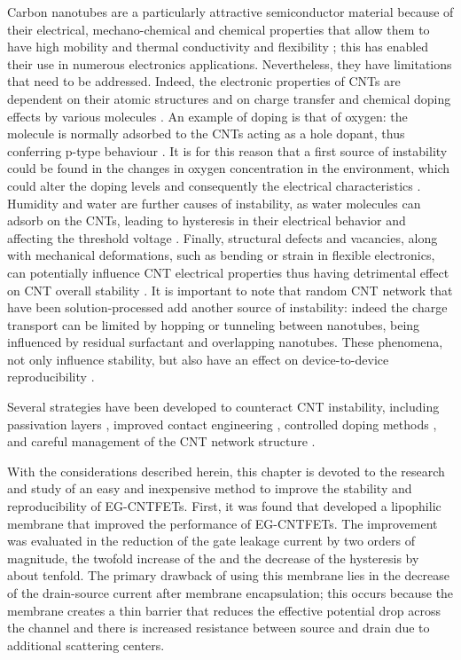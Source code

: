 Carbon nanotubes are a particularly attractive semiconductor material because of their electrical, mechano-chemical and chemical properties that allow them to have high mobility and thermal conductivity and flexibility \citep{joshiUnderstanding2018}; this has enabled their use in numerous electronics applications. Nevertheless, they have limitations that need to be addressed. Indeed, the electronic properties of CNTs are dependent on their atomic structures and on charge transfer and chemical doping effects by various molecules \citep{daiCarbon2002}. An example of doping is that of oxygen: the molecule is normally adsorbed to the CNTs acting as a hole dopant, thus conferring p-type behaviour \citep{daiCarbon2002,mceuenSinglewalled2002}. It is for this reason that a first source of instability could be found in the changes in oxygen concentration in the environment, which could alter the doping levels and consequently the electrical characteristics \citep{mceuenSinglewalled2002}. Humidity and water are further causes of instability, as water molecules can adsorb on the CNTs, leading to hysteresis in their electrical behavior and affecting the threshold voltage \citep{mceuenSinglewalled2002,kimHysteresis2003,zaumseilSemiconducting2019}. Finally, structural defects and vacancies, along with mechanical deformations, such as bending or strain in flexible electronics, can potentially influence CNT electrical properties thus having  detrimental effect on CNT overall stability \citep{daiCarbon2002,rodriguez-manzoCreation2009}.
It is important to note that random CNT network that have been solution-processed add another source of instability: indeed the charge transport can be limited by hopping or tunneling between nanotubes, being influenced by residual surfactant and overlapping nanotubes. These phenomena, not only influence stability, but also have an effect on device-to-device reproducibility \citep{zaumseilSemiconducting2019}.

Several strategies have been developed to counteract CNT instability, including passivation layers \citep{avourisMolecular2002,molazemhosseiniRapidly2021}, improved contact engineering \citep{avourisMolecular2002,javeyCarbon2004,naderiReview2016}, controlled doping methods \citep{avourisMolecular2002,naderiReview2016}, and careful management of the CNT network structure \citep{zaumseilSemiconducting2019,shkodraElectrolytegated2021}.

With the considerations described herein, this chapter is devoted to the research and study of an easy and inexpensive method to improve the stability and reproducibility of EG-CNTFETs.
First, it was found that \citet{joshiUsing2018} developed a lipophilic membrane that improved the performance of EG-CNTFETs. The improvement was evaluated in the reduction of the gate leakage current by two orders of magnitude, the twofold increase of the \ratio{} and the decrease of the hysteresis by about tenfold.
The primary drawback of using this membrane lies in the decrease of the drain-source current after membrane encapsulation; this occurs because the membrane creates a thin barrier that reduces the effective potential drop across the channel and there is increased resistance between source and drain due to additional scattering centers.

